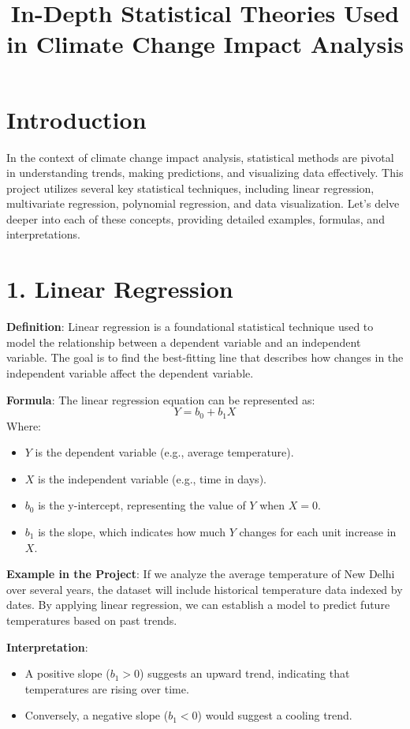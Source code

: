 \documentclass{article}
\title{\textbf{In-Depth Statistical Theories Used in Climate Change Impact Analysis}}
\author{}
\date{}
\begin{document}
\maketitle

\section{Introduction}
In the context of climate change impact analysis, statistical methods are pivotal in understanding trends, making predictions, and visualizing data effectively. This project utilizes several key statistical techniques, including linear regression, multivariate regression, polynomial regression, and data visualization. Let’s delve deeper into each of these concepts, providing detailed examples, formulas, and interpretations.

\section{1. Linear Regression}

\textbf{Definition}: Linear regression is a foundational statistical technique used to model the relationship between a dependent variable and an independent variable. The goal is to find the best-fitting line that describes how changes in the independent variable affect the dependent variable.

\textbf{Formula}: The linear regression equation can be represented as:
\begin{equation}
Y = b_0 + b_1X 
\end{equation}
Where:
\begin{itemize}
    \item $Y$ is the dependent variable (e.g., average temperature).
    \item $X$ is the independent variable (e.g., time in days).
    \item $b_0$ is the y-intercept, representing the value of $Y$ when $X = 0$.
    \item $b_1$ is the slope, which indicates how much $Y$ changes for each unit increase in $X$.
\end{itemize}

\textbf{Example in the Project}: If we analyze the average temperature of New Delhi over several years, the dataset will include historical temperature data indexed by dates. By applying linear regression, we can establish a model to predict future temperatures based on past trends.

\textbf{Interpretation}: 
\begin{itemize}
    \item A positive slope ($b_1 > 0$) suggests an upward trend, indicating that temperatures are rising over time.
    \item Conversely, a negative slope ($b_1 < 0$) would suggest a cooling trend. 
\end{itemize}
\end{document}

